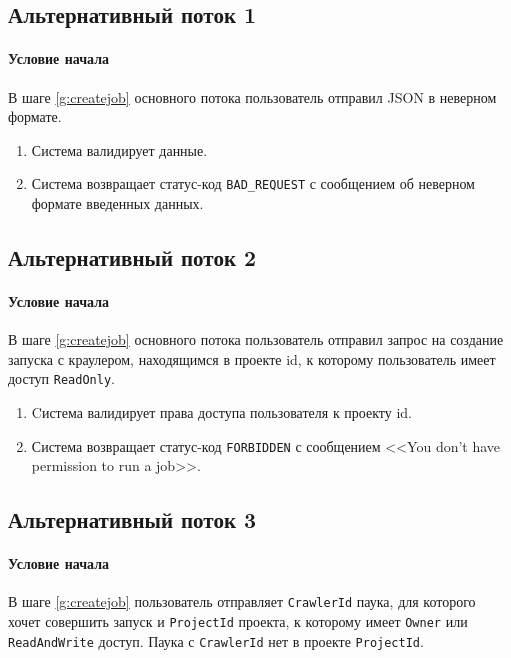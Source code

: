 \documentclass[a4paper,12pt]{article}
\begin{document}
\subsection*{Альтернативный поток 1}

\paragraph*{Условие начала} В шаге \ref{g:createjob} основного потока пользователь отправил JSON в неверном формате. 

\begin{enumerate}
    \def\labelenumi{\arabic{enumi}.}
    \item Система валидирует данные.
    \item Система возвращает статус-код \texttt{BAD\_REQUEST} с сообщением об неверном формате введенных данных. 
\end{enumerate}

\subsection*{Альтернативный поток 2}

\paragraph*{Условие начала} В шаге \ref{g:createjob} основного потока пользователь отправил запрос на создание запуска с краулером, находящимся в проекте id, к которому пользователь имеет доступ \texttt{ReadOnly}.

\begin{enumerate}
    \item Cистема валидирует права доступа пользователя к проекту id.
    \item Система возвращает статус-код \texttt{FORBIDDEN} с сообщением <<You don't have permission to run a job>>.
\end{enumerate}

\subsection*{Альтернативный поток 3}

\paragraph*{Условие начала} В шаге \ref{g:createjob} пользователь отправляет \texttt{CrawlerId} паука, для которого хочет совершить запуск и \texttt{ProjectId} проекта, к которому имеет \texttt{Owner} или \texttt{ReadAndWrite} доступ. Паука с \texttt{CrawlerId} нет в проекте \texttt{ProjectId}.
\end{document}
